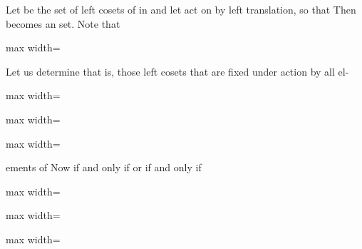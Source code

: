 \documentclass[11pt,oneside]{article}
\begin{document}
\begin{BookBody}
 Let  be the set of left cosets of  in  and let  act on  by left translation, so that  Then  becomes an set. Note that 

\begin{center}\begin{adjustbox}{max width=\linewidth}\end{adjustbox}\end{center}

Let us determine that is, those left cosets that are fixed under action by all el-

\begin{center}\begin{adjustbox}{max width=\linewidth}\end{adjustbox}\end{center}

\begin{center}\begin{adjustbox}{max width=\linewidth}\end{adjustbox}\end{center}

\begin{center}\begin{adjustbox}{max width=\linewidth}\end{adjustbox}\end{center}

\noindent ements of  Now if and only if or if and only if

\begin{center}\begin{adjustbox}{max width=\linewidth}\end{adjustbox}\end{center}

\begin{center}\begin{adjustbox}{max width=\linewidth}\end{adjustbox}\end{center}

\begin{center}\begin{adjustbox}{max width=\linewidth}\end{adjustbox}\end{center}


\end{BookBody}
\end{document}
